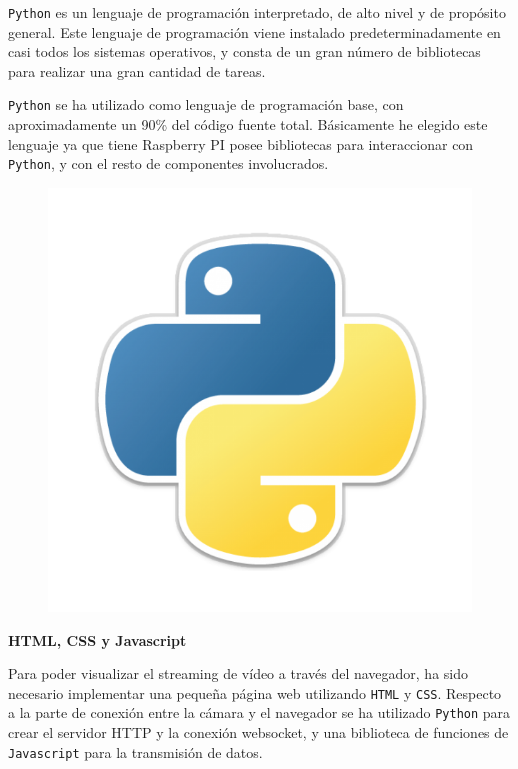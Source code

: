 \texttt{Python} es un lenguaje de programación interpretado, de alto nivel y de propósito general. Este lenguaje de programación viene instalado predeterminadamente en casi todos los sistemas operativos, y consta de un gran número de bibliotecas para realizar una gran cantidad de tareas.

\texttt{Python} se ha utilizado como lenguaje de programación base, con aproximadamente un 90\% del código fuente total. Básicamente he elegido este lenguaje ya que tiene Raspberry PI posee bibliotecas para interaccionar con \texttt{Python}, y con el resto de componentes involucrados.

\begin{figure}[h]
	\centering
	\includegraphics[scale=0.13]{images/8}
\end{figure}

\textbf{HTML, CSS y Javascript}

Para poder visualizar el streaming de vídeo a través del navegador, ha sido necesario implementar una pequeña página web utilizando \texttt{HTML} y \texttt{CSS}. Respecto a la parte de conexión entre la cámara y el navegador se ha utilizado \texttt{Python} para crear el servidor HTTP y la conexión websocket, y una biblioteca de funciones de \texttt{Javascript} para la transmisión de datos.

\vspace{-0.5cm}

